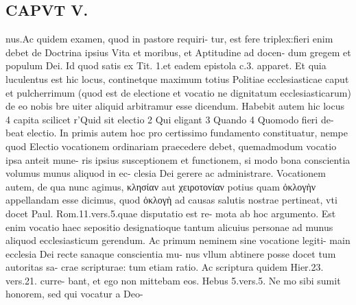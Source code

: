 \documentclass{article}
\begin{document}
\begin{pages}
\section*{CAPVT  V. }
\marginpar{[ p.241 ]}\pstart nus.Ac quidem examen, quod in pastore requiri- tur, est fere triplex:fieri enim debet de Doctrina ipsius Vita et moribus, et Aptitudine ad docen- dum gregem et populum Dei. Id quod satis ex Tit. 1.et eadem epistola c.3. apparet. Et quia luculentus est hic locus, continetque maximum totius Politiae ecclesiasticae caput et pulcherrimum (quod est de electione et vocatio ne dignitatum ecclesiasticarum) de eo nobis bre uiter aliquid arbitramur esse dicendum. Habebit autem hic locus 4 capita scilicet r'Quid sit electio 2 Qui eligant 3 Quando 4 Quomodo fieri de- beat electio. In primis autem hoc pro certissimo fundamento constituatur, nempe quod Electio vocationem ordinariam praecedere debet, quemadmodum vocatio ipsa anteit mune- ris ipsius susceptionem et functionem, si modo bona conscientia volumus munus aliquod in ec- clesia Dei gerere ac administrare. Vocationem autem, de qua nunc agimus, κλησίαν aut χειροτονίαν potius quam ὀκλογὴν appellandam esse dicimus, quod ὀκλογὴ ad causas salutis nostrae pertineat, vti docet Paul. Rom.11.vers.5.quae disputatio est re- mota ab hoc argumento. Est enim vocatio haec sepositio designatioque tantum alicuius personae ad munus aliquod ecclesiasticum gerendum. Ac primum neminem sine vocatione legiti- main ecclesia Dei recte sanaque conscientia mu- nus vllum abtinere posse docet tum autoritas sa- crae scripturae: tum etiam ratio. Ac scriptura quidem Hier.23. vers.21. curre- bant, et ego non mittebam eos. Hebus 5.vers.5. Ne mo sibi sumit honorem, sed qui vocatur a Deo-  \pend

\end{pages}
\end{document}
